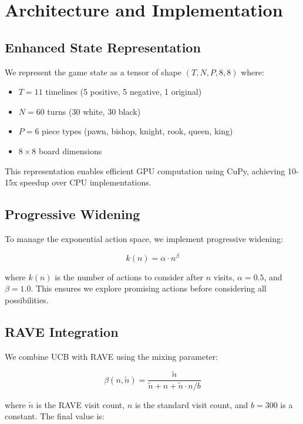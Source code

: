\documentclass[11pt,a4paper]{article}
\begin{document}
\section{Architecture and Implementation}

\subsection{Enhanced State Representation}

We represent the game state as a tensor of shape $(T, N, P, 8, 8)$ where:
\begin{itemize}
    \item $T = 11$ timelines (5 positive, 5 negative, 1 original)
    \item $N = 60$ turns (30 white, 30 black)
    \item $P = 6$ piece types (pawn, bishop, knight, rook, queen, king)
    \item $8 \times 8$ board dimensions
\end{itemize}

This representation enables efficient GPU computation using CuPy, achieving 10-15x speedup over CPU implementations.

\subsection{Progressive Widening}

To manage the exponential action space, we implement progressive widening:

\begin{equation}
k(n) = \alpha \cdot n^\beta
\end{equation}

where $k(n)$ is the number of actions to consider after $n$ visits, $\alpha = 0.5$, and $\beta = 1.0$. This ensures we explore promising actions before considering all possibilities.

\subsection{RAVE Integration}

We combine UCB with RAVE using the mixing parameter:

\begin{equation}
\beta(n, \tilde{n}) = \frac{\tilde{n}}{\tilde{n} + n + \tilde{n} \cdot n / b}
\end{equation}

where $\tilde{n}$ is the RAVE visit count, $n$ is the standard visit count, and $b = 300$ is a constant. The final value is:
\end{document}
